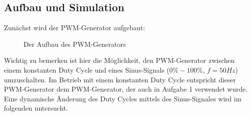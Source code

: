 \documentclass{report}
\begin{document}
\subsection{Aufbau und Simulation}

Zunächst wird der PWM-Generator aufgebaut: 

\begin{figure}
  \begin{center}
  \end{center}
  \caption{Der Aufbau des PWM-Generators}
  \label{fig:aufg2_aufbau_pwm}
\end{figure}


Wichtig zu bemerken ist hier die Möglichkeit, den PWM-Generator zwischen einem konstanten Duty Cycle und eines Sinus-Signals ($0\% - 100\%$, $f=50Hz$) umzuschalten. Im Betrieb mit einem konstanten Duty Cycle entspricht dieser PWM-Generator dem PWM-Generator, der auch in Aufgabe 1 verwendet wurde. Eine dynamische Änderung des Duty Cycles mittels des Sinus-Signales wird im folgenden untersucht.
\end{document}
